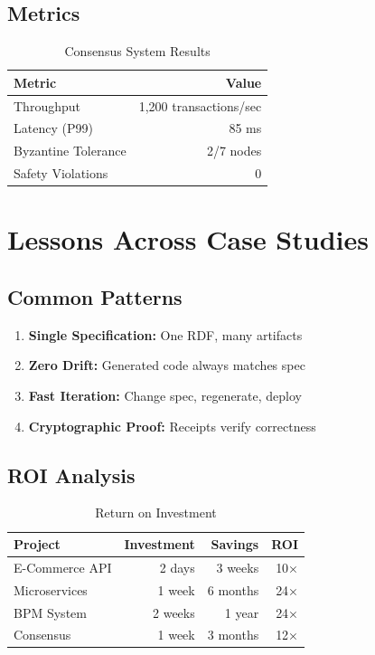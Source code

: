 \subsection{Metrics}

\begin{table}[h]
\centering
\caption{Consensus System Results}
\begin{tabular}{lr}
\toprule
\textbf{Metric} & \textbf{Value} \\
\midrule
Throughput & 1,200 transactions/sec \\
Latency (P99) & 85 ms \\
Byzantine Tolerance & 2/7 nodes \\
Safety Violations & 0 \\
\bottomrule
\end{tabular}
\end{table}

\section{Lessons Across Case Studies}

\subsection{Common Patterns}

\begin{enumerate}
    \item \textbf{Single Specification:} One RDF, many artifacts
    \item \textbf{Zero Drift:} Generated code always matches spec
    \item \textbf{Fast Iteration:} Change spec, regenerate, deploy
    \item \textbf{Cryptographic Proof:} Receipts verify correctness
\end{enumerate}

\subsection{ROI Analysis}

\begin{table}[h]
\centering
\caption{Return on Investment}
\begin{tabular}{lrrr}
\toprule
\textbf{Project} & \textbf{Investment} & \textbf{Savings} & \textbf{ROI} \\
\midrule
E-Commerce API & 2 days & 3 weeks & 10× \\
Microservices & 1 week & 6 months & 24× \\
BPM System & 2 weeks & 1 year & 24× \\
Consensus & 1 week & 3 months & 12× \\
\bottomrule
\end{tabular}
\end{table}

